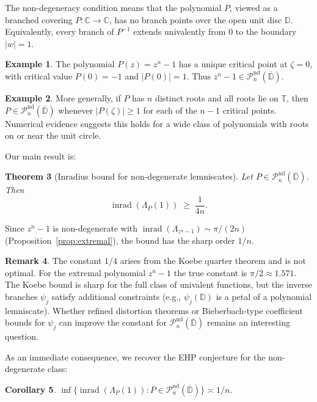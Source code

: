 \documentclass[11pt,a4paper]{amsart}
\newtheorem{theorem}{Theorem}[section]
\newtheorem{corollary}[theorem]{Corollary}
\theoremstyle{definition}
\newtheorem{example}[theorem]{Example}
\newtheorem{remark}[theorem]{Remark}
\newcommand{\D}{\mathbb{D}}
\newcommand{\T}{\mathbb{T}}
\newcommand{\C}{\mathbb{C}}
\newcommand{\Pn}{\mathcal{P}_n}
\newcommand{\abs}[1]{\lvert #1 \rvert}
\newcommand{\inrad}{\operatorname{inrad}}
\begin{document}
The non-degeneracy condition means that the polynomial $P$, viewed as a
branched covering $P \colon \C \to \C$, has no branch points over the open
unit disc $\D$.  Equivalently, every branch of $P^{-1}$ extends
univalently from $0$ to the boundary $\abs{w} = 1$.

\begin{example}\label{ex:roots-of-unity}
The polynomial $P(z) = z^n - 1$ has a unique critical point at $\zeta = 0$,
with critical value $P(0) = -1$ and $\abs{P(0)} = 1$.  Thus
$z^n - 1 \in \Pn^{\mathrm{nd}}(\overline{\D})$.
\end{example}

\begin{example}\label{ex:simple-roots}
More generally, if $P$ has $n$ distinct roots and all roots lie on $\T$,
then $P \in \Pn^{\mathrm{nd}}(\overline{\D})$ whenever
$\abs{P(\zeta)} \geq 1$ for each of the $n-1$ critical points.
Numerical evidence suggests this holds for a wide class of polynomials
with roots on or near the unit circle.
\end{example}

Our main result is:

\begin{theorem}[Inradius bound for non-degenerate lemniscates]
\label{thm:main}
Let $P \in \Pn^{\mathrm{nd}}(\overline{\D})$.  Then
\[
  \inrad(\Lambda_P(1)) \;\geq\; \frac{1}{4n}.
\]
\end{theorem}

Since $z^n - 1$ is non-degenerate with $\inrad(\Lambda_{z^n-1}) \sim \pi/(2n)$
(Proposition~\ref{prop:extremal}),
the bound has the sharp order $1/n$.

\begin{remark}
The constant $1/4$ arises from the Koebe quarter theorem and is not optimal.
For the extremal polynomial $z^n - 1$ the true constant is $\pi/2 \approx 1.571$.
The Koebe bound is sharp for the full class of univalent functions, but
the inverse branches $\psi_j$ satisfy additional constraints
(e.g., $\psi_j(\D)$ is a petal of a polynomial lemniscate).
Whether refined distortion theorems or Bieberbach-type
coefficient bounds for $\psi_j$ can improve the constant for
$\Pn^{\mathrm{nd}}(\overline{\D})$ remains an interesting question.
\end{remark}

As an immediate consequence, we recover the EHP conjecture for the
non-degenerate class:

\begin{corollary}\label{cor:nd-class}
$\inf\bigl\{\inrad(\Lambda_P(1)) : P \in \Pn^{\mathrm{nd}}(\overline{\D})\bigr\}
\asymp 1/n$.
\end{corollary}
\end{document}
